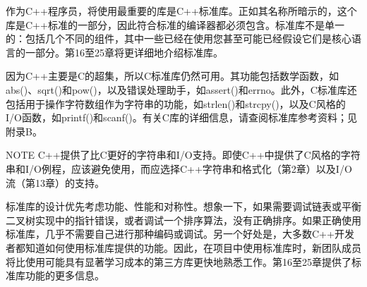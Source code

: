 作为C++程序员，将使用最重要的库是C++标准库。正如其名称所暗示的，这个库是C++标准的一部分，因此符合标准的编译器都必须包含。标准库不是单一的：包括几个不同的组件，其中一些已经在使用您甚至可能已经假设它们是核心语言的一部分。第16至25章将更详细地介绍标准库。


因为C++主要是C的超集，所以C标准库仍然可用。其功能包括数学函数，如abs()、sqrt()和pow()，以及错误处理助手，如assert()和errno。此外，C标准库还包括用于操作字符数组作为字符串的功能，如strlen()和strcpy()，以及C风格的I/O函数，如printf()和scanf()。有关C库的详细信息，请查阅标准库参考资料；见附录B。

\begin{myNotic}{NOTE}
C++提供了比C更好的字符串和I/O支持。即使C++中提供了C风格的字符串和I/O例程，应该避免使用，而应选择C++字符串和格式化（第2章）以及I/O流（第13章）的支持。
\end{myNotic}


标准库的设计优先考虑功能、性能和对称性。想象一下，如果需要调试链表或平衡二叉树实现中的指针错误，或者调试一个排序算法，没有正确排序。如果正确使用标准库，几乎不需要自己进行那种编码或调试。另一个好处是，大多数C++开发者都知道如何使用标准库提供的功能。因此，在项目中使用标准库时，新团队成员将比使用可能具有显著学习成本的第三方库更快地熟悉工作。第16至25章提供了标准库功能的更多信息。








